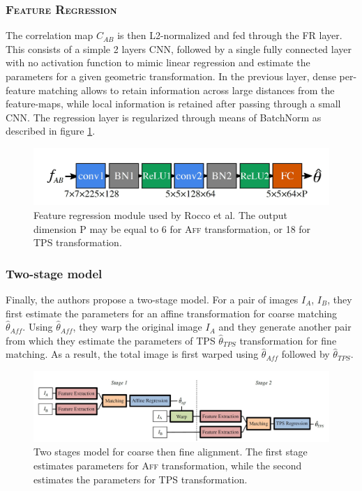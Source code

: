 \documentclass[10pt,conference,compsocconf]{IEEEtran}
\begin{document}
\subsubsection{\textsc{Feature Regression}}
\label{rocco_fr}
The correlation map $C_{AB}$ is then L2-normalized and fed through the FR layer. This consists of a simple 2 layers CNN, followed by a single fully connected layer with no activation function to mimic linear regression and estimate the parameters for a given geometric transformation. In the previous layer, dense per-feature matching allows to retain information across large distances from the feature-maps, while local information is retained after passing through a small CNN. The regression layer is regularized through means of BatchNorm as described in figure \ref{fig:base_fr}.

\vspace{-0.2cm}
\begin{figure}[h!]
    \centering
    \includegraphics[scale = 0.335]{base_featureRegression.jpg}
    \vspace{-0.5cm}
    \caption{Feature regression module used by Rocco et al. The output dimension P may be equal to 6 for \textsc{Aff} transformation, or 18 for \textsc{TPS} transformation.}
    \label{fig:base_fr}
\end{figure}


\subsubsection{Two-stage model}
Finally, the authors propose a two-stage model. For a pair of images $I_{A}$, $I_{B}$, they first estimate the parameters for an affine transformation for coarse matching $\hat{\theta}_{Aff}$. Using $\hat{\theta}_{Aff}$, they warp the original image $I_{A}$ and 
they generate another pair from which they estimate the parameters of \textsc{TPS} $\hat{\theta}_{TPS}$ transformation for fine matching. As a result, the total image is first warped using $\hat{\theta}_{Aff}$ followed by $\hat{\theta}_{TPS}$.

\begin{figure}[h!]
    \centering
    \includegraphics[scale = 0.32]{two_stages.jpg}
    \vspace{-0.3cm}
    \caption{Two stages model for coarse then fine alignment. The first stage estimates parameters for \textsc{Aff} transformation, while the second estimates the parameters for \textsc{TPS} transformation.}
    \label{fig:two_stage}
\end{figure}
\vspace{-0.3cm}
\end{document}
